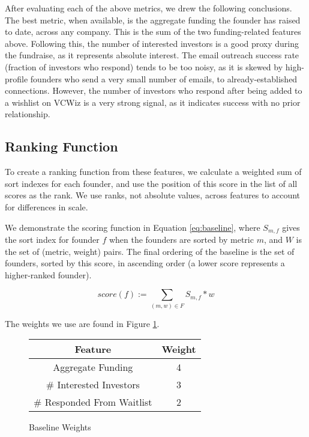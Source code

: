 After evaluating each of the above metrics, we drew the following conclusions. The best metric, when available, is the aggregate funding the founder has raised to date, across any company. This is the sum of the two funding-related features above. Following this, the number of interested investors is a good proxy during the fundraise, as it represents absolute interest. The email outreach success rate (fraction of investors who respond) tends to be too noisy, as it is skewed by high-profile founders who send a very small number of emails, to already-established connections. However, the number of investors who respond after being added to a wishlist on VCWiz is a very strong signal, as it indicates success with no prior relationship.

\subsection{Ranking Function}

To create a ranking function from these features, we calculate a weighted sum of sort indexes for each founder, and use the position of this score in the list of all scores as the rank. We use ranks, not absolute values, across features to account for differences in scale.

We demonstrate the scoring function in Equation \ref{eq:baseline}, where $S_{m, f}$ gives the sort index for founder $f$ when the founders are sorted by metric $m$, and $W$ is the set of (metric, weight) pairs. The final ordering of the baseline is the set of founders, sorted by this score, in ascending order (a lower score represents a higher-ranked founder).

\begin{equation}
\label{eq:baseline}
  score(f) := \sum_{(m, w) \in F} S_{m, f} * w
\end{equation}

\noindent The weights we use are found in Figure \ref{fig:nfr:baseline:weights}.

\begin{figure}[ht]
\begin{tabular}{c | c}
\textbf{Feature}           & \textbf{Weight} \\\hline
Aggregate Funding          & 4 \\\hline
\# Interested Investors    & 3 \\\hline
\# Responded From Waitlist & 2
\end{tabular}
\centering
\caption{Baseline Weights}
\label{fig:nfr:baseline:weights}
\end{figure}

